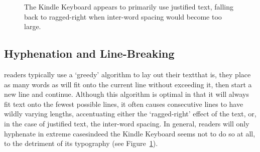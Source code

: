 \begin{figure}
    \centering
    \caption[Poor typography on the Kindle]{The Kindle Keyboard appears to primarily use justified text, falling back to ragged-right when inter-word spacing would become too large.}
    \label{fig:crapkindle}
\end{figure}

\subsection{Hyphenation and Line-Breaking}
\Ebook{} readers typically use a `greedy' algorithm to lay out their text\ed that is, they place as many words as will fit onto the current line without exceeding it, then start a new line and continue. Although this algorithm is optimal in that it will always fit text onto the fewest possible lines, it often causes consecutive lines to have wildly varying lengths, accentuating either the `ragged-right' effect of the text, or, in the case of justified text, the inter-word spacing. In general, \ebook{} readers will only hyphenate in extreme cases\ed indeed the Kindle Keyboard seems not to do so at all, to the detriment of its typography (see Figure~\ref{fig:crapkindle}).

